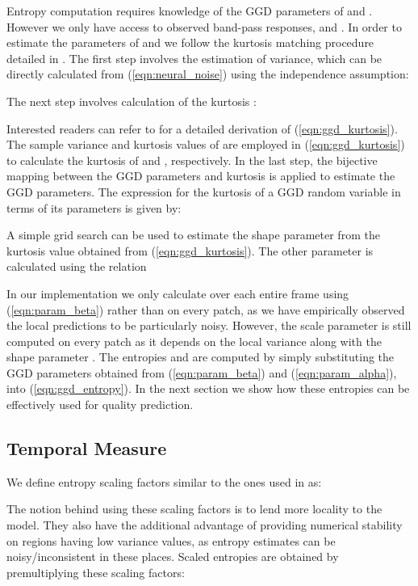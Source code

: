 \documentclass[journal]{IEEEtran}
\begin{document}
Entropy computation requires knowledge of the GGD parameters of  and . However we only have access to observed band-pass responses,  and . In order to estimate the parameters of  and  we follow the kurtosis matching procedure detailed in \cite{soury2015new}. The first step involves the estimation of variance, which can be directly calculated from (\ref{eqn:neural_noise}) using the independence assumption:


The next step involves calculation of the kurtosis :


Interested readers can refer to \cite{soury2015new,pan2012exposing} for a detailed derivation of (\ref{eqn:ggd_kurtosis}). The sample variance and kurtosis values of  are employed in (\ref{eqn:ggd_kurtosis}) to calculate the kurtosis of  and , respectively. In the last step, the bijective mapping between the GGD parameters and kurtosis \cite{soury2015new} is applied to estimate the GGD parameters. The expression for the kurtosis of a GGD random variable in terms of its parameters is given by:


A simple grid search can be used to estimate the shape parameter  from the kurtosis value obtained from (\ref{eqn:ggd_kurtosis}). The other parameter  is calculated using the relation 


In our implementation we only calculate  over each entire frame using (\ref{eqn:param_beta}) rather than on every patch, as we have empirically observed the local predictions to be particularly noisy. However, the scale parameter  is still computed on every patch as it depends on the local variance  along with the shape parameter . The entropies  and  are computed by simply substituting the GGD parameters obtained from (\ref{eqn:param_beta}) and (\ref{eqn:param_alpha}), into (\ref{eqn:ggd_entropy}). In the next section we show how these entropies can be effectively used for quality prediction.

\subsection{Temporal Measure}
We define entropy scaling factors similar to the ones used in \cite{soundararajan2012rred,soundararajan2012video} as:


The notion behind using these scaling factors is to lend more locality to the model. They also have the additional advantage of providing numerical stability on regions having low variance values, as entropy estimates can be noisy/inconsistent in these places. Scaled entropies are obtained by premultiplying these scaling factors:
\end{document}

